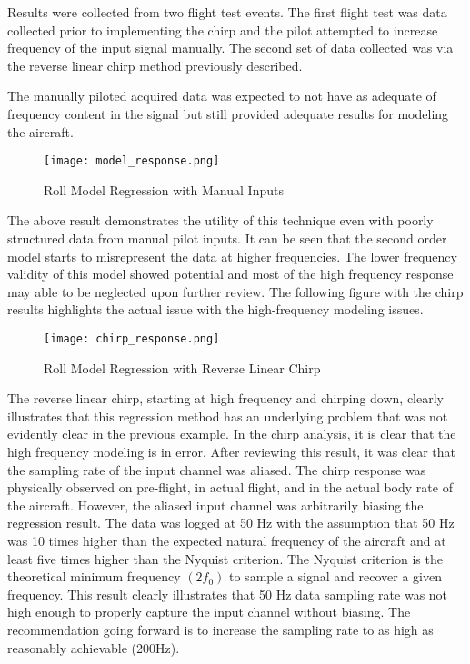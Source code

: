Results were collected from two flight test events.  The first flight test was data collected prior to implementing the chirp and the pilot attempted to increase frequency of the input signal manually.  The second set of data collected was via the reverse linear chirp method previously described.  

The manually piloted acquired data was expected to not have as adequate of frequency content in the signal but still provided adequate results for modeling the aircraft.

\begin{figure}[!h]
 \centering
  \texttt{[image: model\_response.png]}
  \caption{Roll Model Regression with Manual Inputs}
  \label{fig:roll_model}
\end{figure}

The above result demonstrates the utility of this technique even with poorly structured data from manual pilot inputs.  It can be seen that the second order model starts to misrepresent the data at higher frequencies.  The lower frequency validity of this model showed potential and most of the high frequency response may able to be neglected upon further review.  The following figure with the chirp results highlights the actual issue with the high-frequency modeling issues.

\begin{figure}[!h]
 \centering
  \texttt{[image: chirp\_response.png]}
  \caption{Roll Model Regression with Reverse Linear Chirp}
  \label{fig:chirp_model}
\end{figure}

The reverse linear chirp, starting at high frequency and chirping down, clearly illustrates that this regression method has an underlying problem that was not evidently clear in the previous example.  In the chirp analysis, it is clear that the high frequency modeling is in error.  After reviewing this result, it was clear that the sampling rate of the input channel was aliased.  The chirp response was physically observed on pre-flight, in actual flight, and in the actual body rate of the aircraft.  However, the aliased input channel was arbitrarily biasing the regression result.  The data was logged at 50 Hz with the assumption that 50 Hz was 10 times higher than the expected natural frequency of the aircraft and at least five times higher than the Nyquist criterion.  The Nyquist criterion is the theoretical minimum frequency $(2f_0)$ to sample a signal and recover a given frequency.  This result clearly illustrates that 50 Hz data sampling rate was not high enough to properly capture the input channel without biasing.  The recommendation going forward is to increase the sampling rate to as high as reasonably achievable (200Hz).

